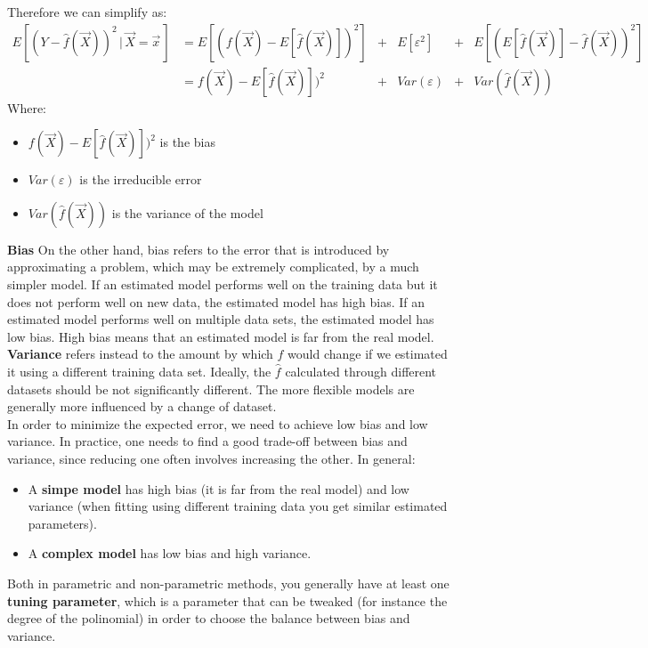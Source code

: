       Therefore we can simplify as:
      \begin{align*}
      E[(Y-\hat{f}(\vec{X}))^2 \,|\, \vec{X} = \vec{x}\,]
      & = E[(f(\vec{X}) - E[\hat{f}(\vec{X})])^2] &+ &E[\varepsilon^2] &+ &E[(E[\hat{f}(\vec{X})] - \hat{f}(\vec{X}))^2] \\
      & = f(\vec{X}) - E[\hat{f}(\vec{X})])^2 &+ &Var(\varepsilon) &+ &Var(\hat{f}(\vec{X})) 
      \end{align*} 
      Where:
      \begin{itemize}
        \item $f(\vec{X}) - E[\hat{f}(\vec{X})])^2$ is the bias
        \item $Var(\varepsilon)$ is the irreducible error
        \item $Var(\hat{f}(\vec{X}))$ is the variance of the model
      \end{itemize}
      \textbf{Bias} On the other hand, bias refers to the error that is introduced by approximating a problem, which may be extremely complicated, by a much
simpler model. If an estimated model performs well on the training data but it does not perform well on new data, the estimated model has high bias. If an estimated model performs well on multiple data sets, the estimated model has low bias. High bias means that an estimated model is far from the real model. \\
      \textbf{Variance} refers instead to the amount by which $\hat{f}$ would change if we
estimated it using a different training data set. Ideally, the $\hat{f}$ calculated 
through different datasets should be not significantly different. The more flexible models are generally more influenced
by a change of dataset. \\
      In order to minimize the expected error, we need to achieve low bias and low variance. In practice, one needs to find a good trade-off between bias and variance, since reducing one often involves increasing the other. In general:
      \begin{itemize}
        \item A \textbf{simpe model} has high bias (it is far from the real model) and low variance (when fitting using different training data you get similar estimated parameters).
        \item A \textbf{complex model} has low bias and high variance.
      \end{itemize}
      Both in parametric and non-parametric methods, you generally have at least one \textbf{tuning parameter}, which is a parameter that can be tweaked (for instance the degree of the polinomial) in order to choose the balance between bias and variance.
